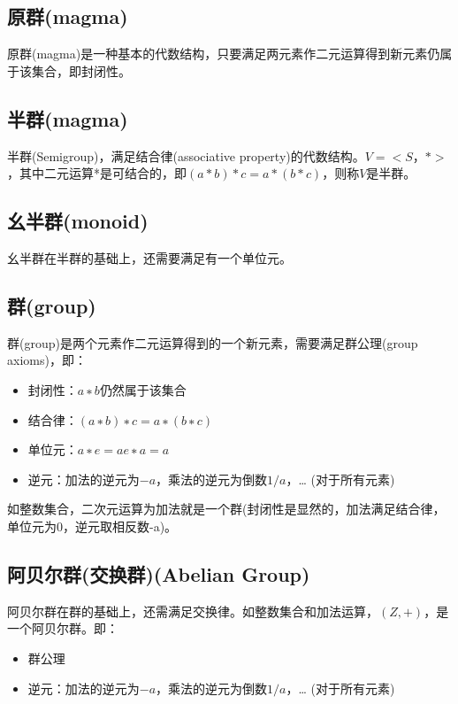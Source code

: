 \documentclass[12pt]{article}
\begin{document}
\subsection{原群(magma)}
原群(magma)是一种基本的代数结构，只要满足两元素作二元运算得到新元素仍属于该集合，即封闭性。

\subsection{半群(magma)}
半群(Semigroup)，满足结合律(associative property)的代数结构。$V=<S，* >$，其中二元运算*是可结合的，即$(a*b)*c=a*(b*c)$，则称$V$是半群。

\subsection{幺半群(monoid)}
幺半群在半群的基础上，还需要满足有一个单位元。

\subsection{群(group)}
群(group)是两个元素作二元运算得到的一个新元素，需要满足群公理(group axioms)，即：
\begin{itemize}
\setlength{\itemsep}{0pt}
\setlength{\parsep}{0pt}
\setlength{\parskip}{0pt}
\item 封闭性：$a ∗ b$仍然属于该集合
\item 结合律：$(a ∗ b) ∗ c = a ∗ (b ∗ c)$
\item 单位元：$a ∗ e = a  e ∗ a = a$
\item 逆元：加法的逆元为$-a$，乘法的逆元为倒数$1/a$，… (对于所有元素)
\end{itemize}

如整数集合，二次元运算为加法就是一个群(封闭性是显然的，加法满足结合律，单位元为0，逆元取相反数-a)。

\subsection{阿贝尔群(交换群)(Abelian Group)}
阿贝尔群在群的基础上，还需满足交换律。如整数集合和加法运算，$(Z,+)$，是一个阿贝尔群。即：
\begin{itemize}
\setlength{\itemsep}{0pt}
\setlength{\parsep}{0pt}
\setlength{\parskip}{0pt}
\item 群公理
\item 逆元：加法的逆元为$-a$，乘法的逆元为倒数$1/a$，… (对于所有元素)
\end{itemize}
\end{document}
